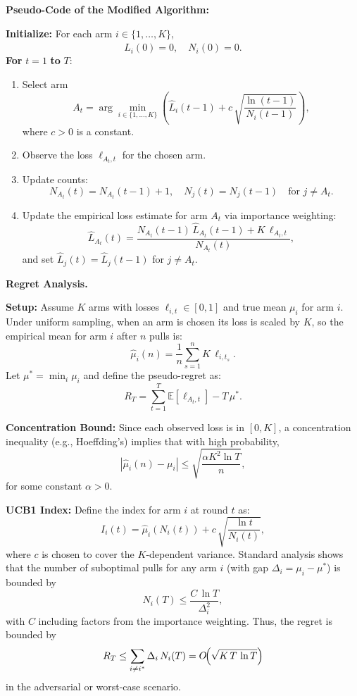 \medskip
\noindent
\textbf{Pseudo-Code of the Modified Algorithm:}
\medskip

\noindent \textbf{Initialize:} For each arm \(i \in \{1,\dots,K\}\),
\[
    \widehat{L}_i(0) = 0,\quad N_i(0)=0.
\]
\noindent
\textbf{For} \(t=1\) \textbf{to} \(T\):
\begin{enumerate}
    \item Select arm 
    \[
      A_t = \arg\min_{i\in\{1,\dots,K\}} \left(\widehat{L}_i(t-1) + c\,\sqrt{\frac{\ln(t-1)}{N_i(t-1)}}\right),
    \]
    where \(c>0\) is a constant.
    \item Observe the loss \(\ell_{A_t,t}\) for the chosen arm.
    \item Update counts:
    \[
      N_{A_t}(t)=N_{A_t}(t-1)+1,\quad N_j(t)=N_j(t-1) \quad\text{for } j\neq A_t.
    \]
    \item Update the empirical loss estimate for arm \(A_t\) via importance weighting:
    \[
      \widehat{L}_{A_t}(t)=\frac{N_{A_t}(t-1)\,\widehat{L}_{A_t}(t-1)+K\,\ell_{A_t,t}}{N_{A_t}(t)},
    \]
    and set \(\widehat{L}_j(t)=\widehat{L}_j(t-1)\) for \(j\neq A_t\).
\end{enumerate}

\medskip
\noindent
\textbf{Regret Analysis.}

\medskip
\noindent
\textbf{Setup:}  
Assume \(K\) arms with losses \(\ell_{i,t}\in[0,1]\) and true mean \(\mu_i\) for arm \(i\).  
Under uniform sampling, when an arm is chosen its loss is scaled by \(K\), so the empirical mean for arm \(i\) after \(n\) pulls is:
\[
  \widehat{\mu}_i(n)=\frac{1}{n}\sum_{s=1}^{n} K\,\ell_{i,t_s}.
\]
Let \(\mu^*=\min_i \mu_i\) and define the pseudo-regret as:
\[
  R_T=\sum_{t=1}^T \mathbb{E}[\ell_{A_t,t}] - T\,\mu^*.
\]

\medskip
\noindent
\textbf{Concentration Bound:}  
Since each observed loss is in \([0,K]\), a concentration inequality (e.g., Hoeffding's) implies that with high probability,
\[
  |\widehat{\mu}_i(n)-\mu_i|\le \sqrt{\frac{\alpha K^2\ln T}{n}},
\]
for some constant \(\alpha>0\).

\medskip
\noindent
\textbf{UCB1 Index:}  
Define the index for arm \(i\) at round \(t\) as:
\[
  I_i(t)=\widehat{\mu}_i(N_i(t)) + c\,\sqrt{\frac{\ln t}{N_i(t)}},
\]
where \(c\) is chosen to cover the \(K\)-dependent variance.  
Standard analysis shows that the number of suboptimal pulls for any arm \(i\) (with gap \(\Delta_i=\mu_i-\mu^*\)) is bounded by
\[
  N_i(T)\le \frac{C\,\ln T}{\Delta_i^2},
\]
with \(C\) including factors from the importance weighting.  
Thus, the regret is bounded by
\[
  R_T \le \sum_{i\neq i^*}\Delta_i\,N_i(T) = O\!\Bigl(\sqrt{K\,T\,\ln T}\Bigr)
\]
in the adversarial or worst-case scenario.

